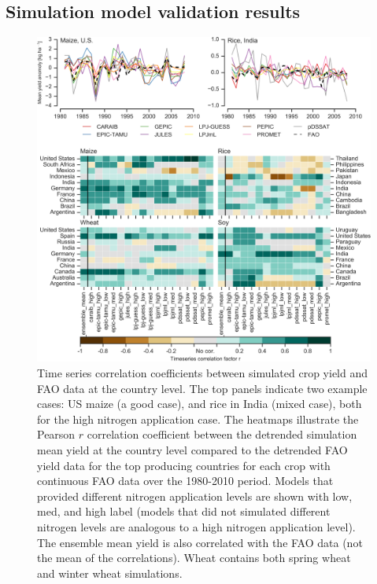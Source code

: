 \documentclass[preprint, 5p, times, twocolumn]{elsarticle}
\begin{document}
\subsection{Simulation model validation results}
\begin{figure}[!htb]
    \centering
    \includegraphics[width=0.95\linewidth]{figures/Agformet_validation.png}
    \caption{Time series correlation coefficients between simulated crop yield and FAO data \citep{FAOSTAT} at the country level. The top panels indicate two example cases: US maize (a good case), and rice in India (mixed case), both for the high nitrogen application case. The heatmaps illustrate the Pearson $r$ correlation coefficient between the detrended simulation mean yield at the country level compared to the detrended FAO yield data for the top producing countries for each crop with continuous FAO data over the 1980-2010 period. Models that provided different nitrogen application levels are shown with low, med, and high label (models that did not simulated different nitrogen levels are analogous to a high nitrogen application level). The ensemble mean yield is also correlated with the FAO data (not the mean of the correlations). Wheat contains both spring wheat and winter wheat simulations.}
    \label{fig:simulation_val}
\end{figure}
\end{document}
